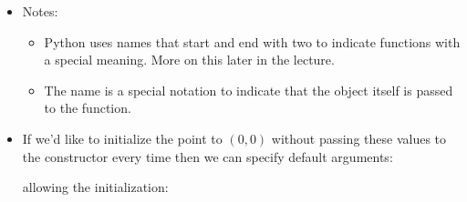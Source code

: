 \documentclass[letterpaper,10pt,english]{sphinxmanual}
\begin{document}
\begin{itemize}
\begin{sphinxVerbatim}[commandchars=\\\{\}]
   
\end{sphinxVerbatim}

\item {} 
Notes:
\begin{itemize}
\item {} 
Python uses names that start and end with two  to indicate
functions with a special meaning.  More on this later in the lecture.

\item {} 
The name  is a special notation to indicate that the object
itself is passed to the function.

\end{itemize}

\item {} 
If we’d like to initialize the point to \((0, 0)\) without passing
these values to the constructor every time then we can specify
default arguments:

\begin{sphinxVerbatim}[commandchars=\\\{\}]
 
       
          
          
\end{sphinxVerbatim}

allowing the initialization:

\begin{sphinxVerbatim}[commandchars=\\\{\}]
  
\end{sphinxVerbatim}

\end{itemize}
\end{document}
